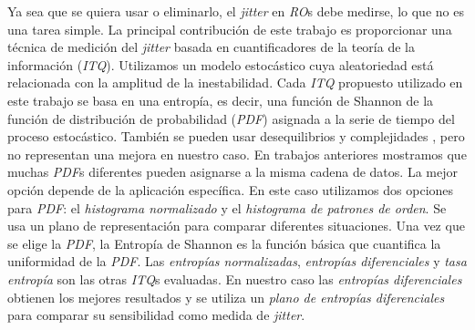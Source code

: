 Ya sea que se quiera usar o eliminarlo, el \textit{jitter} en \emph{RO}s debe medirse, lo que no es una tarea simple.
La principal contribución de este trabajo es proporcionar una técnica de medición del \textit{jitter} basada en cuantificadores de la teoría de la información (\emph{ITQ}).
Utilizamos un modelo estocástico cuya aleatoriedad está relacionada con la amplitud de la inestabilidad.
Cada \emph{ITQ} propuesto utilizado en este trabajo se basa en una entropía, es decir, una función de Shannon de la función de distribución de probabilidad (\emph{PDF}) asignada a la serie de tiempo del proceso estocástico.
También se pueden usar desequilibrios y complejidades \cite{Amigo2005, Rosso2007b}, pero no representan una mejora en nuestro caso.
En trabajos anteriores \cite{DeMicco2008, DeMicco2009} mostramos que muchas \emph{PDF}s diferentes pueden asignarse a la misma cadena de datos.
La mejor opción depende de la aplicación específica.
En este caso utilizamos dos opciones para \emph{PDF}: el \emph{histograma normalizado} y el \emph{histograma de patrones de orden}.
Se usa un plano de representación para comparar diferentes situaciones.
Una vez que se elige la \emph{PDF}, la Entropía de Shannon es la función básica que cuantifica la uniformidad de la \emph{PDF}.
Las \emph{entropías normalizadas}, \emph{entropías diferenciales} y \emph{tasa entropía} son las otras \emph{ITQ}s evaluadas.
En nuestro caso las \emph{entropías diferenciales} obtienen los mejores resultados y se utiliza un \emph{plano de entropías diferenciales} para comparar su sensibilidad como medida de \textit{jitter}.